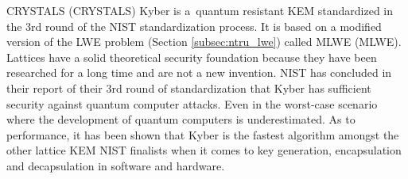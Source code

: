 CRYSTALS (\acl{CRYSTALS}) Kyber is a~quantum resistant KEM  standardized in the 3rd round of the NIST standardization process. It is based on a modified version of the LWE problem (Section \ref{subsec:ntru_lwe}) called MLWE (\acl{MLWE}). Lattices have a solid theoretical security foundation because they have been researched for a long time and are not a new invention. NIST has concluded in their report of their 3rd round of standardization that Kyber has sufficient security against quantum computer attacks. Even in the worst-case scenario where the development of quantum computers is underestimated. As to performance, it has been shown that Kyber is the fastest algorithm amongst the other lattice KEM NIST finalists when it comes to key generation, encapsulation and decapsulation in software and hardware. \cite{Grimes2020}\cite{Alagic2022}
